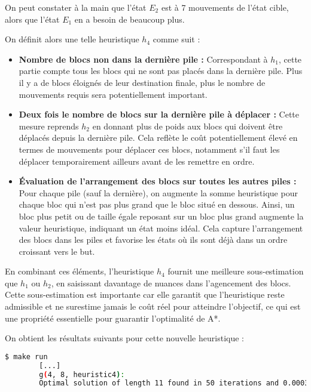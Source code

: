 On peut constater à la main que l'état $E_2$ est à 7 mouvements de l'état cible, alors que l'état $E_1$ en a besoin de beaucoup plus.

On définit alors une telle heuristique $h_4$ comme suit :

\begin{itemize}
    \item \textbf{Nombre de blocs non dans la dernière pile :} Correspondant à \(h_1\), cette partie compte tous les blocs qui ne sont pas placés dans la dernière pile. Plus il y a de blocs éloignés de leur destination finale, plus le nombre de mouvements requis sera potentiellement important.
    
    \item \textbf{Deux fois le nombre de blocs sur la dernière pile à déplacer :} Cette mesure reprends \(h_2\) en donnant plus de poids aux blocs qui doivent être déplacés depuis la dernière pile. Cela reflète le coût potentiellement élevé en termes de mouvements pour déplacer ces blocs, notamment s'il faut les déplacer temporairement ailleurs avant de les remettre en ordre.
    
    \item \textbf{Évaluation de l'arrangement des blocs sur toutes les autres piles :} Pour chaque pile (sauf la dernière), 
    on augmente la somme heuristique pour chaque bloc qui n'est pas plus grand que le bloc situé en dessous. Ainsi, un bloc plus petit ou de taille égale reposant sur un bloc plus grand augmente la valeur heuristique, indiquant un état moins idéal. Cela capture l'arrangement des blocs dans les piles et favorise les états où ils sont déjà dans un ordre croissant vers le but.
\end{itemize}

En combinant ces éléments, l'heuristique $h_4$ fournit une meilleure sous-estimation que $h_1$ ou $h_2$, en saisissant davantage de nuances dans l'agencement des blocs. Cette sous-estimation est importante car elle garantit que l'heuristique reste admissible et ne surestime jamais le coût réel pour atteindre l'objectif, ce qui est une propriété essentielle pour guarantir l'optimalité de A*.

On obtient les résultats suivants pour cette nouvelle heuristique :

\begin{minipage}{\dimexpr\linewidth-20pt}
    \begin{lstlisting}[language=bash, caption={Résultats de l'exécution du programme de recherche de plus court chemin avec l'heuristique $h_4$ pour $k = 4$ piles et $n = 8$ blocs.}, label={lst:plus_court_chemin_results_h4_first_res}]
        $ make run
        [...]
        g(4, 8, heuristic4): 
        Optimal solution of length 11 found in 50 iterations and 0.000341 seconds
    \end{lstlisting}
\end{minipage}

